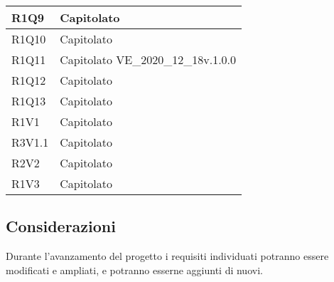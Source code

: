 \begin{center}
\begin{longtable}{|p{22mm}|p{44mm}|}
R1Q9 &
Capitolato \newline
\\
\hline

R1Q10 &
Capitolato \newline
\\
\hline

R1Q11 &
Capitolato \newline
VE\_2020\_12\_18v.1.0.0 \newline
\\
\hline

R1Q12 &
Capitolato \newline
\\
\hline

R1Q13 &
Capitolato \newline
\\
\hline

 R1V1 &
Capitolato \newline
\\
\hline

R3V1.1 &
Capitolato \newline
\\
\hline

R2V2 &
Capitolato \newline
\\
\hline

R1V3 &
Capitolato \newline
\\
\hline%
	
	\end{longtable}
\end{center}

\subsection{Considerazioni}
Durante l'avanzamento del progetto i requisiti individuati potranno essere modificati e ampliati, e potranno esserne aggiunti di nuovi.